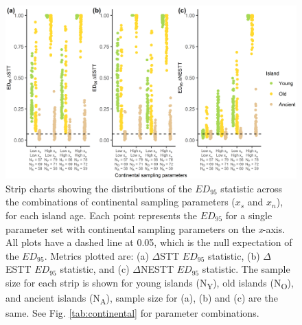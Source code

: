 \documentclass{article}
\begin{document}
\begin{figure}
    \centering
    \includegraphics[width=\textwidth]{continental_facet.png}
    \caption{Strip charts showing the distributions of the $ED_{95}$ statistic across the combinations of continental sampling parameters ($x_s$ and $x_n$), for each island age. Each point represents the $ED_{95}$ for a single parameter set with continental sampling parameters on the \textit{x}-axis. All plots have a dashed line at 0.05, which is the null expectation of the $ED_{95}$. Metrics plotted are: (a) $\Delta$STT $ED_{95}$ statistic, (b) $\Delta$ESTT $ED_{95}$ statistic, and (c) $\Delta$NESTT $ED_{95}$ statistic. The sample size for each strip is shown for young islands (N\textsubscript{Y}), old islands (N\textsubscript{O}), and ancient islands (N\textsubscript{A}), sample size for (a), (b) and (c) are the same. See Fig. \ref{tab:continental} for parameter combinations.}
    \label{fig:continental_facet}
\end{figure}

\clearpage
\end{document}
